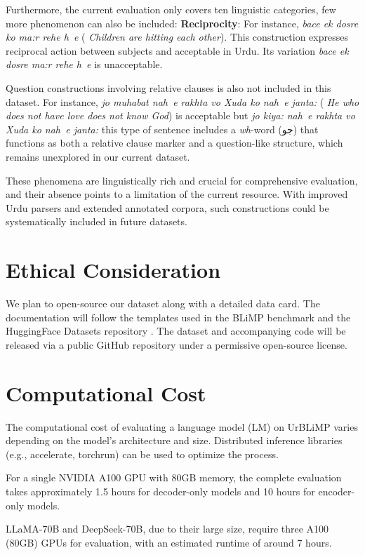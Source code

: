 \documentclass[11pt]{article}
\begin{document}
Furthermore, the current evaluation only covers ten linguistic categories, few more phenomenon can also be included:
\textbf{Reciprocity}: For instance,
\textit{ bace ek dosre ko ma:r rehe h~{e}}  (
    \textit{Children are hitting each other}). This construction expresses reciprocal action between subjects and acceptable in Urdu. Its variation  \textit{ bace ek dosre  ma:r rehe h~{e}}    is unacceptable.

Question constructions involving relative clauses is also not included in this dataset. For instance,  
 \textit{   jo muhabat nah~{e} rakhta vo Xuda ko nah~{e} janta:}
  (
    \textit{He who does not have love does not know God})  is acceptable but  \textit{   jo kiya: nah~{e} rakhta vo Xuda ko nah~{e} janta:} this type of sentence includes a \textit{wh}-word (\foreignlanguage{arabic}{جو}) that functions as both a relative clause marker and a question-like structure, which remains unexplored in our current dataset.

These phenomena are linguistically rich and crucial for comprehensive evaluation, and their absence points to a limitation of the current resource. With improved Urdu parsers and extended annotated corpora, such constructions could be systematically included in future datasets.



\appendix

\section{Ethical Consideration}
We plan to open-source our dataset along with a detailed data card. The documentation will follow the templates used in the BLiMP benchmark \cite{blimp} and the HuggingFace Datasets repository \cite{huggingfaceDataset}. The dataset and accompanying code will be released via a public GitHub repository under a permissive open-source license.
\section{Computational Cost}
The computational cost of evaluating a language model (LM) on UrBLiMP varies depending on the model's architecture and size. Distributed inference libraries (e.g., accelerate, torchrun) can be used to optimize the process.

For a single NVIDIA A100 GPU with 80GB memory, the complete evaluation takes approximately 1.5 hours for decoder-only models and 10 hours for encoder-only models.

LLaMA-70B and DeepSeek-70B, due to their large size, require three A100 (80GB) GPUs for evaluation, with an estimated runtime of around 7 hours.
\end{document}
